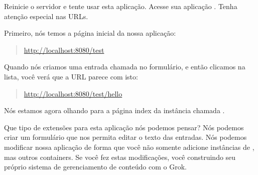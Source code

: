 \documentclass[a4paper,12pt,portuguese]{manual}
\begin{document}
Reinicie o servidor e tente usar esta aplicação. Acesse sua aplicação
. Tenha atenção especial nas URLs.

Primeiro, nós temos a página inicial da nossa aplicação:
\begin{quote}

\href{http://localhost:8080/test}{http://localhost:8080/test}
\end{quote}

Quando nós criamos uma entrada chamada  no formulário, e
então clicamos na lista, você verá que a URL parece com isto:
\begin{quote}

\href{http://localhost:8080/test/hello}{http://localhost:8080/test/hello}
\end{quote}

Nós estamos agora olhando para a página index da instância 
chamada .

Que tipo de extensões para esta aplicação nós podemos pensar? Nós
podemos criar um formulário  que nos permita editar o texto
das entradas. Nós podemos modificar nossa aplicação de forma que você
não somente adicione instâncias de , mas outros containers.
Se você fez estas modificações, você construindo seu próprio sistema
de gerenciamento de conteúdo com o Grok.


\renewcommand{\indexname}{Índice do Módulo}

\renewcommand{\indexname}{Índice}
\printindex
\end{document}
